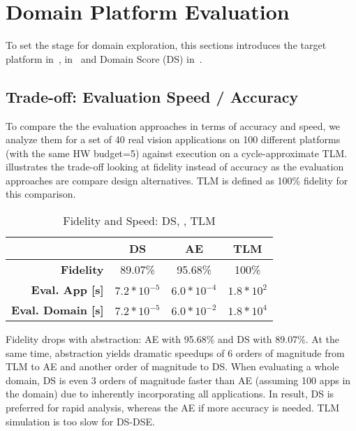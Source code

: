 \section{Domain Platform Evaluation}
\label{sec:EvaOp}

To set the stage for domain exploration,
this sections introduces the
target platform in~,  in~ and Domain Score (DS) in~. ~ 






\subsection{Trade-off: Evaluation Speed / Accuracy }
\label{sec:eva:sum}

To compare the the evaluation approaches in terms of accuracy and speed, we analyze them for a set of 40 real vision applications on 100 different platforms (with the same HW budget=5) against execution on a cycle-approximate TLM. %
 illustrates the trade-off looking at fidelity instead of accuracy as the evaluation approaches are compare design alternatives. TLM is defined as 100\% fidelity for this comparison.

\begin{table}[h]
	\caption{Fidelity and Speed: DS, , TLM}
	\label{tab:fidelity}
	\centering
	\begin{tabular}{r||c|c|c}
		\toprule
		  & \textbf{DS}& \textbf{AE}& \textbf{TLM}\\
		\hline
		\midrule
		\textbf{Fidelity} & 89.07\%& 95.68\%& 100\%\\
		\hline
		\textbf{Eval. App [s]} & $7.2*10^{-5}$ & $6.0*10^{-4}$ & $1.8*10^2$ \\
		\hline
		\textbf{Eval. Domain [s]} & $7.2*10^{-5}$ & $6.0*10^{-2}$ & $1.8*10^4$ \\
		\bottomrule
	\end{tabular}
\end{table} 

Fidelity drops with abstraction: AE with 95.68\% and DS with 89.07\%. At the same time, abstraction yields dramatic speedups of 6 orders of magnitude from TLM to AE and another order of magnitude to DS. When evaluating a whole domain, DS is even 3 orders of magnitude faster than AE (assuming 100 apps in the domain) due to inherently incorporating all applications. In result, DS is preferred for rapid analysis, whereas the AE if more accuracy is needed. TLM simulation is too slow for DS-DSE.